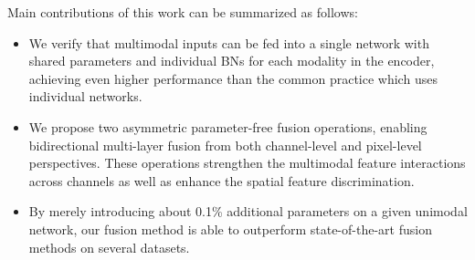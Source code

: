 \documentclass[sigconf]{acmart}
\begin{document}
Main contributions of this work can be summarized as follows:
\leftmargini=7mm
\begin{itemize}
\setlength\itemsep{0em}

\item We verify that multimodal inputs can be fed into a single network with shared parameters and individual BNs for each modality in the encoder, achieving even higher performance than the common practice which uses individual networks.

\item We propose two asymmetric parameter-free fusion operations, enabling bidirectional multi-layer fusion from both channel-level and pixel-level perspectives. These operations strengthen the multimodal feature interactions across channels as well as enhance the spatial feature discrimination.

\item By merely introducing about 0.1\% additional parameters on a given unimodal network, our fusion method is able to outperform state-of-the-art fusion methods on several datasets.


\end{itemize}
\end{document}
